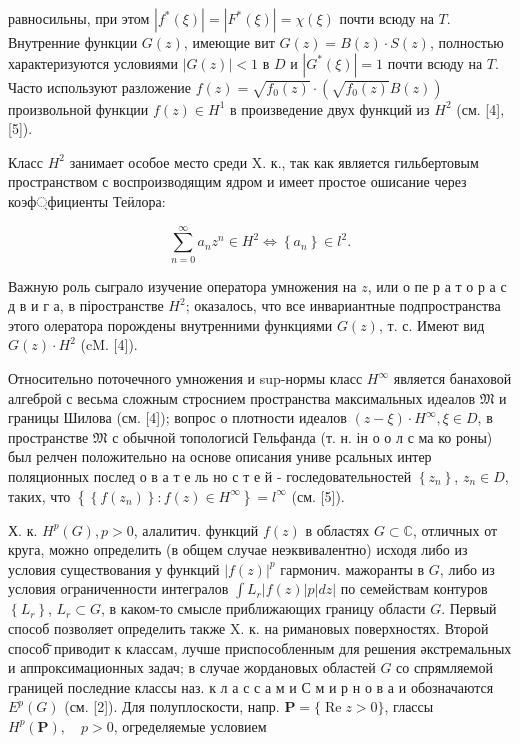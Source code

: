 \documentclass[10pt]{article}
\begin{document}
равносильны, при этом $\left|f^{*}(\xi)\right|=\left|F^{*}(\xi)\right|=\chi(\xi)$ почти всюду на $T$. Внутренние функции $G(z)$, имеющие вит $G(z)=B(z) \cdot S(z)$, полностью характеризуются условиями $|G(z)|<1$ в $D$ и $\left|G^{*}(\xi)\right|=1$ почти всюду на $T$. Часто используют разложение $f(z)=\sqrt{f_{0}(z)} \cdot\left(\sqrt{f_{0}(z)} B(z)\right)$ произвольной функции $f(z) \in H^{1}$ в произведение двух функций из $H^{2}$ (см. [4], [5]).



Класс $H^{2}$ занимает особое место среди X. к., так как является гильбертовым пространством с воспроизводящим ядром и имеет простое ошисание через коэф্фициенты Теӥлора:



\[

\sum_{n=0}^{\infty} a_{n} z^{n} \in H^{2} \Leftrightarrow\left\{a_{n}\right\} \in l^{2} .

\]



Важную роль сыграло изучение оператора умножения на $z$, или о пе р а т о р а с д в и г а, в піространстве $H^{2}$; оказалось, что все инвариантные подпространства этого олератора порождены внутренними функциями $G(z)$, т. с. Имеют вид $G(z) \cdot H^{2}$ (cM. [4]).



Относительно поточечного умножения и sup-нормы класс $H^{\infty}$ является банаховой алгеброй с весьма сложным строснием пространства максимальных идеалов $\mathfrak{M}$ и границы Шилова (см. [4]); вопрос о плотности идеалов $(z-\xi) \cdot H^{\infty}, \xi \in D$, в пространстве $\mathfrak{M}$ с обычной топологисй Гельфанда (т. н. ін о о л с ма ко роны) был релчен положительно на основе описания униве рсальных интер поляционных послед о в а т е ль но с т е й - госледовательностей $\left\{z_{n}\right\}$, $z_{n} \in D$, таких, что $\left\{\left\{f\left(z_{n}\right)\right\}: f(z) \in H^{\infty}\right\}=l^{\infty}$ (см. [5]).



Х. к. $H^{p}(G), p>0$, алалитич. функций $f(z)$ в областях $G \subset \mathbb{C}$, отличных от круга, можно определить (в общем случае неэквивалентно) исходя либо из условия существования у функций $|f(z)|^{p}$ гармонич. мажоранты в $G$, либо из условия ограниченности интегралов $\int L_{r}|f(z)| p|d z|$ по семействам контуров $\left\{L_{r}\right\}$, $L_{r} \subset G$, в каком-то смысле приближающих границу области $G$. Первый способ позволяет определить также X. к. на римановых поверхностях. Второй способ̄ приводит к классам, лучше приспособленным для решения әкстремальных и аппроксимационных задач; в случае жордановых областей $G$ со спрямляемой границей последние классы наз. к л а с с а м и С м и р н о в а и обозначаются $E^{p}(G)$ (см. [2]). Для полуплоскости, напр. $\boldsymbol{P}=\{\operatorname{Re} z>0\}$, глассы $H^{p}(\boldsymbol{P}), \quad p>0$, огределяемые условием
\end{document}
